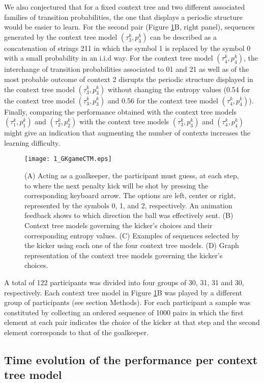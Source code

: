 \documentclass[fleqn,10pt]{wlscirep}
\begin{document}
We also conjectured that for a fixed context tree and two different associated families of transition probabilities, the one that displays a periodic structure would be easier to learn. For the second pair (Figure \ref{fig:exp_design}B, right panel), sequences generated by the context tree model $(\tau^k_3, p^k_3)$  can be described as a concatenation of strings 211 in which the symbol 1 is replaced by the symbol 0 with a small probability in an i.i.d way. For the context tree model $(\tau^k_4, p^k_4)$, the interchange of transition probabilities associated to 01 and 21 as well as of the most probable outcome of context 2 disrupts the periodic structure displayed in the context tree model $(\tau^k_3, p^k_3)$ without changing the entropy values (0.54 for the context tree model $(\tau^k_3, p^k_3)$ and 0.56 for the context tree model $(\tau^k_4, p^k_4)$). Finally, comparing the performance obtained with the context tree models $(\tau^k_1, p^k_1)$ and $(\tau^k_2, p^k_2)$ with the context tree models $(\tau^k_3, p^k_3)$ and $(\tau^k_4, p^k_4)$ might give an indication that augmenting the number of contexts increases the learning difficulty.

\begin{figure}[p]
	\texttt{[image: 1\_GKgameCTM.eps]}
	\caption{(A) Acting as a goalkeeper, the participant must guess, at each step, to where the next penalty kick will be shot by pressing the corresponding keyboard arrow. The options are left, center or right, represented by the symbols 0, 1, and 2, respectively. An animation feedback shows to which direction the ball was effectively sent. (B) Context tree models governing the kicker’s choices and their corresponding entropy values. (C) Examples of sequences selected by the kicker using each one of the four context tree models. (D) Graph representation of the context tree models governing the kicker’s choices.}	
	\label{fig:exp_design}
\end{figure}

A total of 122 participants was divided into four groups of 30, 31, 31 and 30, respectively. Each context tree model in Figure \ref{fig:exp_design}B was played by a different group of participants (see section Methods). For each participant a sample was constituted by collecting an ordered sequence of 1000 pairs in which the first element at each pair indicates the choice of the kicker at that step and the second element corresponds to that of the goalkeeper.

\subsection*{Time evolution of the performance per context tree model}
\end{document}
